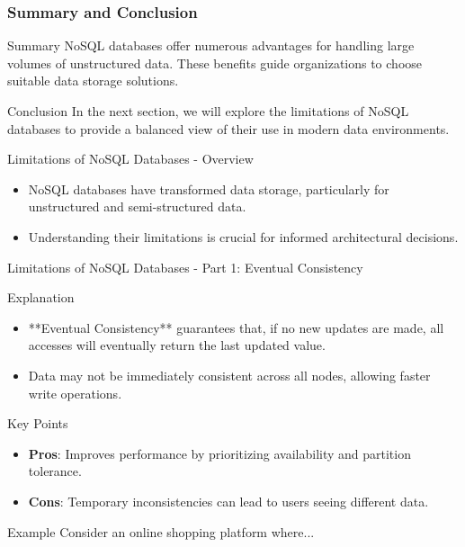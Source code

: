 \documentclass[aspectratio=169]{beamer}
\begin{document}
\begin{frame}[fragile]
    \frametitle{Summary and Conclusion}
    \begin{block}{Summary}
        NoSQL databases offer numerous advantages for handling large volumes of unstructured data. These benefits guide organizations to choose suitable data storage solutions.
    \end{block}
    \begin{block}{Conclusion}
        In the next section, we will explore the limitations of NoSQL databases to provide a balanced view of their use in modern data environments.
    \end{block}
\end{frame}

\begin{frame}[fragile]{Limitations of NoSQL Databases - Overview}
    \begin{itemize}
        \item NoSQL databases have transformed data storage, particularly for unstructured and semi-structured data.
        \item Understanding their limitations is crucial for informed architectural decisions.
    \end{itemize}
\end{frame}

\begin{frame}[fragile]{Limitations of NoSQL Databases - Part 1: Eventual Consistency}
    \begin{block}{Explanation}
        \begin{itemize}
            \item **Eventual Consistency** guarantees that, if no new updates are made, all accesses will eventually return the last updated value.
            \item Data may not be immediately consistent across all nodes, allowing faster write operations.
        \end{itemize}
    \end{block}

    \begin{block}{Key Points}
        \begin{itemize}
            \item \textbf{Pros}: Improves performance by prioritizing availability and partition tolerance.
            \item \textbf{Cons}: Temporary inconsistencies can lead to users seeing different data.
        \end{itemize}
    \end{block}

    \begin{block}{Example}
        Consider an online shopping platform where...
    \end{block}
\end{frame}
\end{document}
